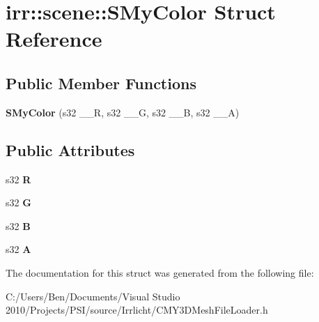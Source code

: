 \hypertarget{structirr_1_1scene_1_1_s_my_color}{\section{irr\-:\-:scene\-:\-:S\-My\-Color Struct Reference}
\label{structirr_1_1scene_1_1_s_my_color}
}
\subsection*{Public Member Functions}
\begin{DoxyCompactItemize}
\item 
\hypertarget{structirr_1_1scene_1_1_s_my_color_afcb3551c6f71aa5e59f08648d88347e1}{{\bfseries S\-My\-Color} (s32 \-\_\-\-\_\-\-R, s32 \-\_\-\-\_\-\-G, s32 \-\_\-\-\_\-\-B, s32 \-\_\-\-\_\-\-A)}\label{structirr_1_1scene_1_1_s_my_color_afcb3551c6f71aa5e59f08648d88347e1}

\end{DoxyCompactItemize}
\subsection*{Public Attributes}
\begin{DoxyCompactItemize}
\item 
\hypertarget{structirr_1_1scene_1_1_s_my_color_ad9dd5e59e06d1b9959fb4b3cda96a295}{s32 {\bfseries R}}\label{structirr_1_1scene_1_1_s_my_color_ad9dd5e59e06d1b9959fb4b3cda96a295}

\item 
\hypertarget{structirr_1_1scene_1_1_s_my_color_afca94380385c3a07130cce41792ebb95}{s32 {\bfseries G}}\label{structirr_1_1scene_1_1_s_my_color_afca94380385c3a07130cce41792ebb95}

\item 
\hypertarget{structirr_1_1scene_1_1_s_my_color_a910bb6e71d3a91b8cab5f841de7c2301}{s32 {\bfseries B}}\label{structirr_1_1scene_1_1_s_my_color_a910bb6e71d3a91b8cab5f841de7c2301}

\item 
\hypertarget{structirr_1_1scene_1_1_s_my_color_a2e6b66ecb15251576b3951b0a4c88875}{s32 {\bfseries A}}\label{structirr_1_1scene_1_1_s_my_color_a2e6b66ecb15251576b3951b0a4c88875}

\end{DoxyCompactItemize}


The documentation for this struct was generated from the following file\-:\begin{DoxyCompactItemize}
\item 
C\-:/\-Users/\-Ben/\-Documents/\-Visual Studio 2010/\-Projects/\-P\-S\-I/source/\-Irrlicht/C\-M\-Y3\-D\-Mesh\-File\-Loader.\-h\end{DoxyCompactItemize}
